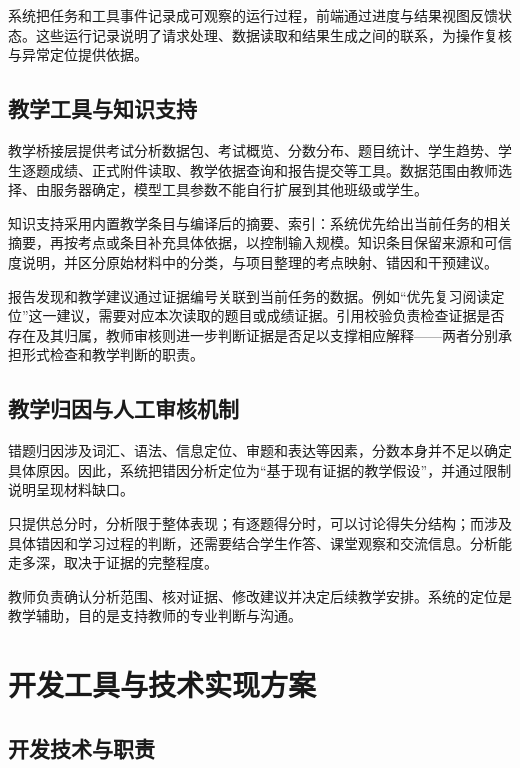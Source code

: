 \documentclass[11pt,a4paper,fontset=none]{ctexart}
\begin{document}
系统把任务和工具事件记录成可观察的运行过程，前端通过进度与结果视图反馈状态。这些运行记录说明了请求处理、数据读取和结果生成之间的联系，为操作复核与异常定位提供依据。

\subsection{教学工具与知识支持}

教学桥接层提供考试分析数据包、考试概览、分数分布、题目统计、学生趋势、学生逐题成绩、正式附件读取、教学依据查询和报告提交等工具。数据范围由教师选择、由服务器确定，模型工具参数不能自行扩展到其他班级或学生。

知识支持采用内置教学条目与编译后的摘要、索引：系统优先给出当前任务的相关摘要，再按考点或条目补充具体依据，以控制输入规模。知识条目保留来源和可信度说明，并区分原始材料中的分类，与项目整理的考点映射、错因和干预建议。

报告发现和教学建议通过证据编号关联到当前任务的数据。例如“优先复习阅读定位”这一建议，需要对应本次读取的题目或成绩证据。引用校验负责检查证据是否存在及其归属，教师审核则进一步判断证据是否足以支撑相应解释——两者分别承担形式检查和教学判断的职责。

\subsection{教学归因与人工审核机制}

错题归因涉及词汇、语法、信息定位、审题和表达等因素，分数本身并不足以确定具体原因。因此，系统把错因分析定位为“基于现有证据的教学假设”，并通过限制说明呈现材料缺口。

只提供总分时，分析限于整体表现；有逐题得分时，可以讨论得失分结构；而涉及具体错因和学习过程的判断，还需要结合学生作答、课堂观察和交流信息。分析能走多深，取决于证据的完整程度。

教师负责确认分析范围、核对证据、修改建议并决定后续教学安排。系统的定位是教学辅助，目的是支持教师的专业判断与沟通。

\section{开发工具与技术实现方案}

\subsection{开发技术与职责}
\end{document}
